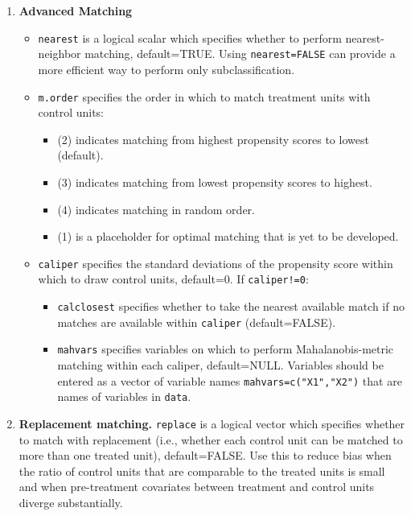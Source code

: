 \documentclass[oneside,letterpaper,titlepage]{article}
\begin{document}
\begin{enumerate}
\item \textbf{Advanced Matching}
  \begin{itemize}
  \item \texttt{nearest} is a logical scalar which specifies whether
    to perform nearest-neighbor matching, default=TRUE.  Using
    \texttt{nearest=FALSE} can provide a more efficient way to
    perform only subclassification. 
  \item \texttt{m.order}  specifies the order in which to match
    treatment units with control units:
    \begin{itemize}
    \item (2) indicates matching from highest propensity scores to
      lowest (default).
    \item (3) indicates matching from lowest propensity scores to
      highest.
    \item (4) indicates matching in random order.
    \item (1) is a placeholder for optimal matching that is yet to be
      developed.
    \end{itemize}
  \item \texttt{caliper} specifies the standard deviations of 
    the propensity score within which to draw control units,
    default=0.  If \texttt{caliper!=0}: 
    \begin{itemize} 
    \item \texttt{calclosest} specifies whether to take the nearest
      available match if no matches are available within
      \texttt{caliper} (default=FALSE).
    \item \texttt{mahvars} specifies variables on which to perform
      Mahalanobis-metric matching within each caliper, default=NULL.
      Variables should be entered as a vector of variable names
      \texttt{mahvars=c("X1","X2")} that are names of variables in
      \texttt{data}.
    \end{itemize}
  \end{itemize}
  
\item \textbf{Replacement matching.} \texttt{replace} is a logical
  vector which specifies whether to match with replacement (i.e.,
  whether each control unit can be matched to more than one treated
  unit), default=FALSE.  Use this to reduce bias when the ratio of
  control units that are comparable to the treated units is small and
  when pre-treatment covariates between treatment and control units
  diverge substantially.
  

\end{enumerate}
\end{document}
